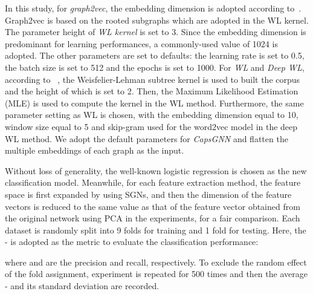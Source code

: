 \documentclass[10pt,journal,compsoc]{IEEEtran}
\begin{document}
In this study, for \emph{graph2vec}, the embedding dimension is adopted  according to~\cite{narayanan2017graph2vec}. Graph2vec is based on the rooted subgraphs which are adopted in the WL kernel. The parameter height of \emph{WL kernel} is set to 3. Since the embedding dimension is predominant for learning performances, a commonly-used value of 1024 is adopted. The other parameters are set to defaults: the learning rate is set to 0.5, the batch size is set to 512 and the epochs is set to 1000. For \emph{WL} and \emph{Deep WL}, according to ~\cite{yanardag2015deep}, the Weisfelier-Lehman subtree kernel is used to built the corpus and the height of which is set to 2. Then, the Maximum Likelihood Estimation (MLE) is used to compute the kernel in the WL method. Furthermore, the same parameter setting as WL is chosen, with the embedding dimension equal to 10, window size equal to 5 and skip-gram used for the word2vec model in the deep WL method. We adopt the default parameters for \emph{CapsGNN} and flatten the multiple embeddings of each graph as the input.

Without loss of generality, the well-known logistic regression is chosen as the new classification model. Meanwhile, for each feature extraction method, the feature space is first expanded by using SGNs, and then the dimension of the feature vectors is reduced to the same value as that of the feature vector obtained from the original network using PCA in the experiments, for a fair comparison. Each dataset is randomly split into 9 folds for training and 1 fold for testing. Here, the - is adopted as the metric to evaluate the classification performance:

where  and  are the precision and recall, respectively. To exclude the random effect of the fold assignment, experiment is repeated for 500 times and then the average - and its standard deviation are recorded.
\end{document}

